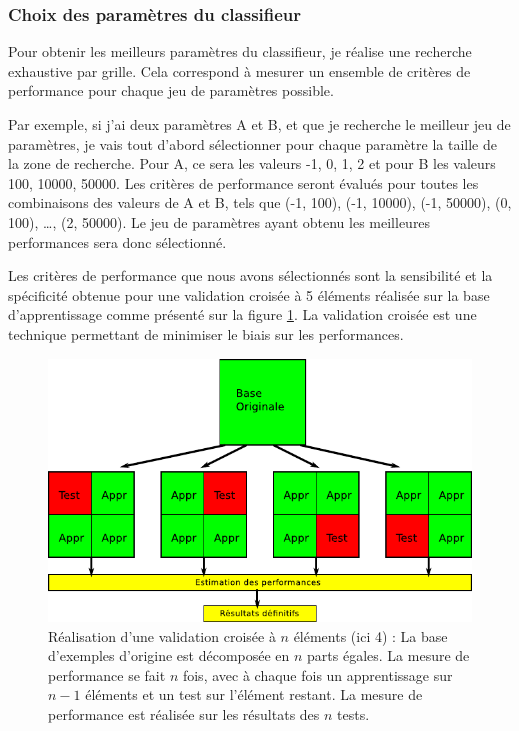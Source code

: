 \subsubsection{Choix des paramètres du classifieur}

Pour obtenir les meilleurs paramètres du classifieur, je réalise une recherche exhaustive par grille. Cela correspond à mesurer un ensemble de critères de performance pour chaque jeu de paramètres possible.

Par exemple, si j'ai deux paramètres A et B, et que je recherche le meilleur jeu de paramètres, je vais tout d'abord sélectionner pour chaque paramètre la taille de la zone de recherche. Pour A, ce sera les valeurs {-1, 0, 1, 2} et pour B les valeurs {100, 10000, 50000}. Les critères de performance seront évalués pour toutes les combinaisons des valeurs de A et B, tels que (-1, 100), (-1, 10000), (-1, 50000), (0, 100), \dots, (2, 50000). Le jeu de paramètres ayant obtenu les meilleures performances sera donc sélectionné. 

Les critères de performance que nous avons sélectionnés sont la sensibilité et la spécificité obtenue pour une validation croisée à 5 éléments réalisée sur la base d'apprentissage comme présenté sur la figure \ref{fig:crossValid}. La validation croisée est une technique permettant de minimiser le biais sur les performances.

\begin{figure}[h!]
 \includegraphics[width=15cm]{images/crossValid}
 \caption{Réalisation d'une validation croisée à $n$ éléments (ici 4) : La base d'exemples d'origine est décomposée en $n$ parts égales. La mesure de performance se fait $n$ fois, avec à chaque fois un apprentissage sur $n-1$ éléments et un test sur l'élément restant. La mesure de performance est réalisée sur les résultats des $n$ tests.}
 \label{fig:crossValid}
\end{figure}


